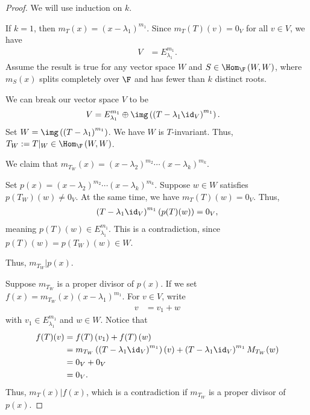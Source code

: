 \documentclass[10pt]{mypackage}
\begin{document}
\begin{proof}
  We will use induction on $k$.\newline

  If $k = 1$, then $m_T(x) = \left(x-\lambda_1\right)^{m_1}$. Since $m_{T}\left(T\right)\left(v\right) = 0_V$ for all $v\in V$, we have
  \begin{align*}
    V &= E_{\lambda_1}^{m_1}.
  \end{align*}
  Assume the result is true for any vector space $W$ and $S\in \Hom_{\F}\left(W,W\right)$, where $m_S(x)$ splits completely over $\F$ and has fewer than $k$ distinct roots.\newline

  We can break our vector space $V$ to be
  \begin{align*}
    V &= E_{\lambda_1}^{m_1}\oplus \img\left(\left(T-\lambda_1\id_{V}\right)^{m_1}\right).
  \end{align*}
  Set $W = \img\left(\left(T-\lambda_1\right)^{m_1}\right)$. We have $W$ is $T$-invariant. Thus, $T_W := T\vert_{W}\in \Hom_{\F}\left(W,W\right)$.\newline

  We claim that $m_{T_W}(x) = \left(x-\lambda_2\right)^{m_2}\cdots \left(x-\lambda_k\right)^{m_k}$.\newline

  Set $p(x) = \left(x-\lambda_2\right)^{m_2}\cdots \left(x-\lambda_k\right)^{m_k}$. Suppose $w\in W$ satisfies $p\left(T_W\right)\left(w\right) \neq 0_V$. At the same time, we have $m_{T}(T)(w) = 0_V$. Thus,
  \begin{align*}
    \left(T-\lambda_1\id_V\right)^{m_1}\left(p(T)(w)\right) = 0_V,
  \end{align*}
  meaning $p(T)(w) \in E_{\lambda_1}^{m_1}$. This is a contradiction, since $p(T)(w) = p\left(T_W\right)(w)\in W$.\newline

  Thus, $m_{T_W}|p(x)$.\newline

  Suppose $m_{T_W}$ is a proper divisor of $p(x)$. If we set $f(x) = m_{T_W}(x)\left(x-\lambda_1\right)^{m_1}$. For $v\in V$, write
  \begin{align*}
    v &= v_1 + w
  \end{align*}
  with $v_1\in E_{\lambda_1}^{m_1}$ and $w\in W$. Notice that
  \begin{align*}
    f(T)(v) &= f(T)\left(v_1\right) + f(T)\left(w\right)\\
            &= m_{T_W}\left(\left(T-\lambda_1\id_V\right)^{m_1}\right)(v) + \left(T-\lambda_1\id_V\right)^{m_1}M_{T_W}(w)\\
            &= 0_V + 0_V\\
            &= 0_V.
  \end{align*}
  Thus, $m_{T}(x)|f(x)$, which is a contradiction if $m_{T_W}$ is a proper divisor of $p(x)$.\newline


\end{proof}
\end{document}
